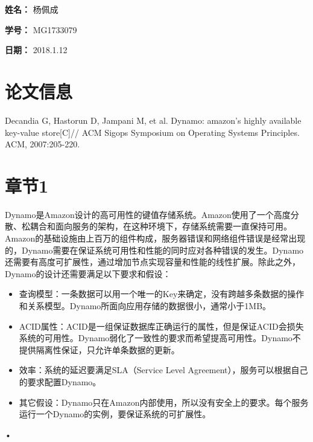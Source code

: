 \documentclass[UTF8]{article}
\begin{document}
    
{\flushleft \bf \Large 姓名：} 杨佩成

{\flushleft \bf \Large 学号：} MG1733079

{\flushleft \bf \Large 日期：} 2018.1.12


\section*{论文信息}
    
Decandia G, Hastorun D, Jampani M, et al. Dynamo: amazon's highly available key-value store[C]// ACM Sigops Symposium on Operating Systems Principles. ACM, 2007:205-220.
    
\section{章节1}
	Dynamo是Amazon设计的高可用性的键值存储系统。Amazon使用了一个高度分散、松耦合和面向服务的架构，在这种环境下，存储系统需要一直保持可用。Amazon的基础设施由上百万的组件构成，服务器错误和网络组件错误是经常出现的，Dynamo需要在保证系统可用性和性能的同时应对各种错误的发生。Dynamo还需要有高度可扩展性，通过增加节点实现容量和性能的线性扩展。除此之外，Dynamo的设计还需要满足以下要求和假设：
\begin{itemize}
	\item
		查询模型：一条数据可以用一个唯一的Key来确定，没有跨越多条数据的操作和关系模型。Dynamo所面向应用存储的数据很小，通常小于1MB。
	\item
           ACID属性：ACID是一组保证数据库正确运行的属性，但是保证ACID会损失系统的可用性。Dynamo弱化了一致性的要求而希望提高可用性。Dynamo不提供隔离性保证，只允许单条数据的更新。
	\item
           效率：系统的延迟要满足SLA（Service Level Agreement），服务可以根据自己的要求配置Dynamo。
	\item
           其它假设：Dynamo只在Amazon内部使用，所以没有安全上的要求。每个服务运行一个Dynamo的实例，要保证系统的可扩展性。
		
\end{itemize}•
\end{document}
